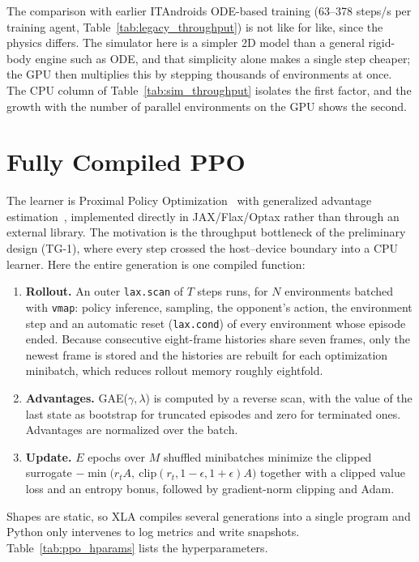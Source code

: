 The comparison with earlier ITAndroids ODE-based training (63--378 steps/s per training agent, Table~\ref{tab:legacy_throughput}) is not like for like, since the physics differs.  The simulator here is a simpler 2D model than a general rigid-body engine such as ODE,
and that simplicity alone makes a single step cheaper; the GPU then multiplies this by stepping thousands of environments at once.  The CPU column of Table~\ref{tab:sim_throughput} isolates the first factor, and the
growth with the number of parallel environments on the GPU shows the second.

\section{Fully Compiled PPO}
\label{sec:ppo}

The learner is Proximal Policy Optimization~\cite{schulman2017ppo} with generalized advantage
estimation~\cite{schulman2015gae}, implemented directly in JAX/Flax/Optax rather than through an external
library.  The motivation is the throughput bottleneck of the preliminary design (TG-1), where every step crossed the
host--device boundary into a CPU learner.  Here the entire generation is one compiled function:
\begin{enumerate}
  \item \textbf{Rollout.} An outer \texttt{lax.scan} of $T$ steps runs, for $N$ environments batched with \texttt{vmap}: policy inference, sampling, the opponent's action, the
        environment step and an automatic reset (\texttt{lax.cond}) of every environment whose episode ended.  Because
        consecutive eight-frame histories share seven frames, only the newest frame is stored and the histories are rebuilt
        for each optimization minibatch, which reduces rollout memory roughly eightfold.
  \item \textbf{Advantages.} GAE($\gamma,\lambda$) is computed by a reverse scan, with the value of the last state as
        bootstrap for truncated episodes and zero for terminated ones.  Advantages are normalized over the batch.
  \item \textbf{Update.} $E$ epochs over $M$ shuffled minibatches minimize the clipped surrogate
        $-\min\!\big(r_t A,\ \mathrm{clip}(r_t,1\!-\!\epsilon,1\!+\!\epsilon)A\big)$ together with a clipped value loss and an entropy bonus,
        followed by gradient-norm clipping and Adam.
\end{enumerate}
Shapes are static, so XLA compiles several generations into a single program and Python only intervenes to log
metrics and write snapshots.  Table~\ref{tab:ppo_hparams} lists the hyperparameters.

